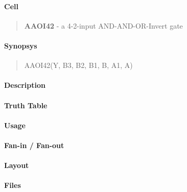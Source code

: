 \label{AAOI42}
\paragraph{Cell}
\begin{quote}
    \textbf{AAOI42} - a 4-2-input AND-AND-OR-Invert gate
\end{quote}

\paragraph{Synopsys}
\begin{quote}
    AAOI42(Y, B3, B2, B1, B, A1, A)
\end{quote}

\paragraph{Description}

%

\paragraph{Truth Table}
%

\paragraph{Usage}

\paragraph{Fan-in / Fan-out}

\paragraph{Layout}

\paragraph{Files}
